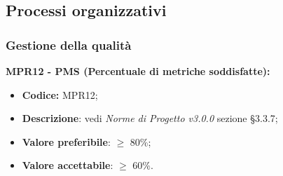 \subsection{Processi organizzativi}
\subsubsection{Gestione della qualità}
\textbf{MPR12 - PMS (Percentuale di metriche soddisfatte):}
\begin{itemize}
    \item \textbf{Codice:} MPR12;
    \item \textbf{Descrizione}: vedi \textit{Norme di Progetto v3.0.0} sezione \S 3.3.7;
    \item \textbf{Valore preferibile}: $\geq$ 80\%;
    \item \textbf{Valore accettabile}: $\geq$ 60\%.
\end{itemize}
\newpage
